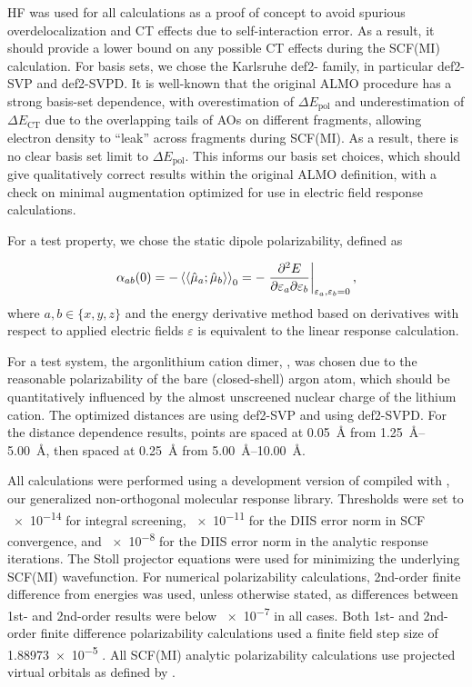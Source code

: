 \documentclass[%
  class = book,%
  crop = false,%
  float = true,%
  multi = true,%
  preview = false,%
]{standalone}
\begin{document}
HF was used for all calculations as a proof of concept to avoid spurious overdelocalization and CT effects due to self-interaction error. As a result, it should provide a lower bound on any possible CT effects during the SCF(MI) calculation. For basis sets, we chose the Karlsruhe def2- family\cite{Weigend_2005_3297,Rappoport_2010_134105}, in particular def2-SVP and def2-SVPD. It is well-known that the original ALMO procedure has a strong basis-set dependence, with overestimation of \(\Delta E_{\text{pol}}\) and underestimation of \(\Delta E_{\text{CT}}\) due to the overlapping tails of AOs on different fragments, allowing electron density to ``leak'' across fragments during SCF(MI)\cite{doi:10.1063/1.4792434}. As a result, there is no clear basis set limit to \(\Delta E_{\text{pol}}\). This informs our basis set choices, which should give qualitatively correct results within the original ALMO definition, with a check on minimal augmentation optimized for use in electric field response calculations.

For a test property, we chose the static dipole polarizability, defined as

\begin{equation}
  \alpha_{ab}(0) = -\braket{\braket{\hat{\mu}_{a}; \hat{\mu}_{b}}}_{0} = -\left.\frac{\partial^{2} E}{\partial \varepsilon_a \partial \varepsilon_b}\right|_{\varepsilon_{a},\varepsilon_{b}=0},
\end{equation}
where \(a,b \in \{x,y,z\}\) and the energy derivative method based on derivatives with respect to applied electric fields \(\varepsilon\) is equivalent to the linear response calculation.

For a test system, the argon\textemdash{}lithium cation dimer, \arlidimer{}, was chosen due to the reasonable polarizability of the bare (closed-shell) argon atom, which should be quantitatively influenced by the almost unscreened nuclear charge of the lithium cation. The optimized distances are \geomdeftsvp{} using def2-SVP and \geomdeftsvpd{} using def2-SVPD. For the distance dependence results, points are spaced at \SI{0.05}{\angstrom} from \SIrange{1.25}{5.00}{\angstrom}, then spaced at \SI{0.25}{\angstrom} from \SIrange{5.00}{10.00}{\angstrom}.

All calculations were performed using a development version of \qchem{}\cite{Shao2015} compiled with \libresponse{}, our generalized non-orthogonal molecular response library. Thresholds were set to \num{e-14} for integral screening, \num{e-11} for the DIIS error norm in SCF convergence, and \num{e-8} for the DIIS error norm in the analytic response iterations. The Stoll projector equations were used for minimizing the underlying SCF(MI) wavefunction\cite{Stoll_1980_169,Khaliullin2006}. For numerical polarizability calculations, 2nd-order finite difference from energies was used, unless otherwise stated, as differences between 1st- and 2nd-order results were below \num{e-7} \aud{} in all cases. Both 1st- and 2nd-order finite difference polarizability calculations used a finite field step size of \num{1.88973e-5} \aud{}. All SCF(MI) analytic polarizability calculations use projected virtual orbitals as defined by .
\end{document}
